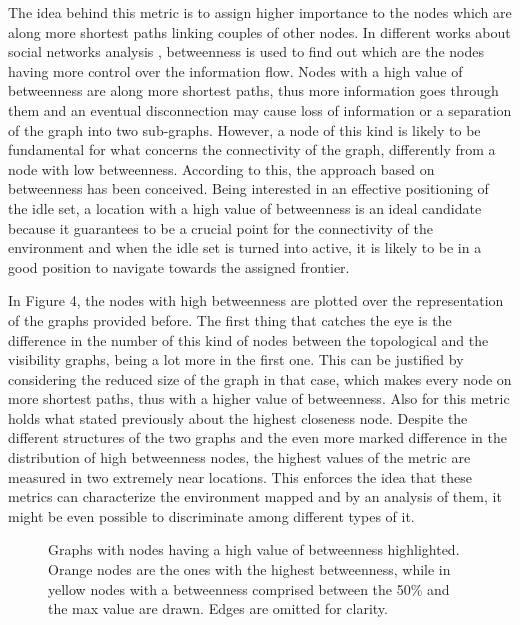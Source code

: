 The idea behind this metric is to assign higher importance to the
nodes which are along more shortest paths linking couples of other
nodes. In different works about social networks analysis \cite{Freeman1978},
betweenness is used to find out which are the nodes having more control
over the information flow. Nodes with a high value of betweenness
are along more shortest paths, thus more information goes through
them and an eventual disconnection may cause loss of information or
a separation of the graph into two sub-graphs. However, a node of
this kind is likely to be fundamental for what concerns the connectivity
of the graph, differently from a node with low betweenness. According
to this, the approach based on betweenness has been conceived. Being
interested in an effective positioning of the idle set, a location
with a high value of betweenness is an ideal candidate because it
guarantees to be a crucial point for the connectivity of the environment
and when the idle set is turned into active, it is likely to be in
a good position to navigate towards the assigned frontier. 

In Figure 4, the nodes with high betweenness are plotted over the
representation of the graphs provided before. The first thing that
catches the eye is the difference in the number of this kind of nodes
between the topological and the visibility graphs, being a lot more
in the first one. This can be justified by considering the reduced
size of the graph in that case, which makes every node on more shortest
paths, thus with a higher value of betweenness. Also for this metric
holds what stated previously about the highest closeness node. Despite
the different structures of the two graphs and the even more marked
difference in the distribution of high betweenness nodes, the highest
values of the metric are measured in two extremely near locations.
This enforces the idea that these metrics can characterize the environment
mapped and by an analysis of them, it might be even possible to discriminate
among different types of it. 

\begin{figure}


\caption{Graphs with nodes having a high value of betweenness highlighted.
Orange nodes are the ones with the highest betweenness, while in yellow
nodes with a betweenness comprised between the 50\% and the max value
are drawn. Edges are omitted for clarity.}

\end{figure}


